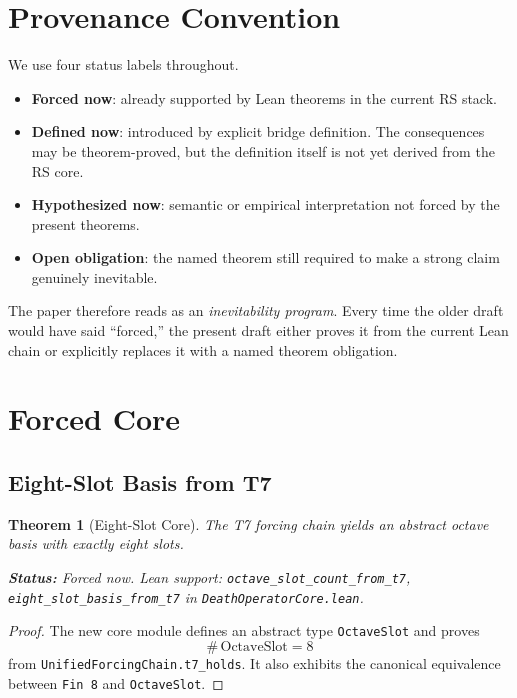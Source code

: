 \documentclass[11pt,a4paper]{article}
\newtheorem{theorem}{Theorem}[section]
\theoremstyle{definition}
\newcommand{\code}[1]{\texttt{\small #1}}
\newcommand{\statusline}[1]{\par\smallskip\noindent\textbf{Status:} #1\par\smallskip}
\begin{document}
\section{Provenance Convention}
\label{sec:provenance}

We use four status labels throughout.

\begin{itemize}
\item \textbf{Forced now}: already supported by Lean theorems in the current
  RS stack.
\item \textbf{Defined now}: introduced by explicit bridge definition.  The
  consequences may be theorem-proved, but the definition itself is not yet
  derived from the RS core.
\item \textbf{Hypothesized now}: semantic or empirical interpretation not
  forced by the present theorems.
\item \textbf{Open obligation}: the named theorem still required to make a
  strong claim genuinely inevitable.
\end{itemize}

The paper therefore reads as an \emph{inevitability program}.  Every time
the older draft would have said ``forced,'' the present draft either proves
it from the current Lean chain or explicitly replaces it with a named theorem
obligation.

\section{Forced Core}
\label{sec:core}

\subsection{Eight-Slot Basis from T7}

\begin{theorem}[Eight-Slot Core]
\label{thm:eight-slot}
The T7 forcing chain yields an abstract octave basis with exactly eight
slots.
\statusline{Forced now. Lean support: \code{octave\_slot\_count\_from\_t7},
\code{eight\_slot\_basis\_from\_t7} in \code{DeathOperatorCore.lean}.}
\end{theorem}

\begin{proof}
The new core module defines an abstract type \code{OctaveSlot} and proves
\[
  \#\,\text{OctaveSlot} = 8
\]
from \code{UnifiedForcingChain.t7\_holds}.  It also exhibits the canonical
equivalence between \code{Fin 8} and \code{OctaveSlot}.
\end{proof}
\end{document}
